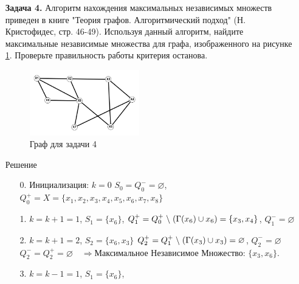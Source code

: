 \documentclass{article}
\begin{document}
\clearpage%
\begin{enumerate}\item[\textbf{Задача 4.}] Алгоритм нахождения максимальных независимых множеств приведен в книге "Теория графов. Алгоритмический подход" (Н. Кристофидес, стр. 46-49). Используя данный алгоритм, найдите максимальные независимые множества для графа, изображенного на рисунке \ref{fig:figure4_graph}. Проверьте правильность работы критерия останова.
\begin{figure}[h]
    \includegraphics[width=0.45\textwidth, center]{attachments/4/graph.png}
    \caption{Граф для задачи 4}
    \label{fig:figure4_graph}
\end{figure}
\begin{center}
Решение 
\end{center}
\begin{enumerate}
    \item[0.] Инициализация:
        \quad $k = 0$
        \quad $S_0 = Q_0^{-} =\varnothing$,
        \quad  $Q_0^{+} = X = \{x_1,x_2,x_3,x_4,x_5,x_6,x_7,x_8\}$
    \item[1.] %
        $k = k +1 = 1$,
        \quad $S_1 = \{x_6\}$,
        \quad  $Q_1^{+} =Q_0^{+} \hspace{1mm}\backslash\hspace{1mm} (\Gamma (x_6) \cup x_6) = \{x_3,x_4\}$,
        \quad  $Q_1^{-} = \varnothing$
    \item[2.] $k = k+1 = 2$,
        \quad $S_2 = \{x_6,x_3\}$
        \quad  $Q_2^{+} =Q_1^{+} \hspace{1mm}\backslash\hspace{1mm} (\Gamma (x_3) \cup x_3) =  \varnothing$,
        \quad  $Q_2^{-} = \varnothing$\\
         $Q_2^{-} = Q_2^{+} = \varnothing\quad\Longrightarrow \textbf{Максимальное Независимое Множество: }\{x_3,x_6\}$.
    \item[3.]  $k = k - 1 = 1$,
        \quad $S_1 = \{x_6\}$,

\end{enumerate}
\end{enumerate}
\end{document}
